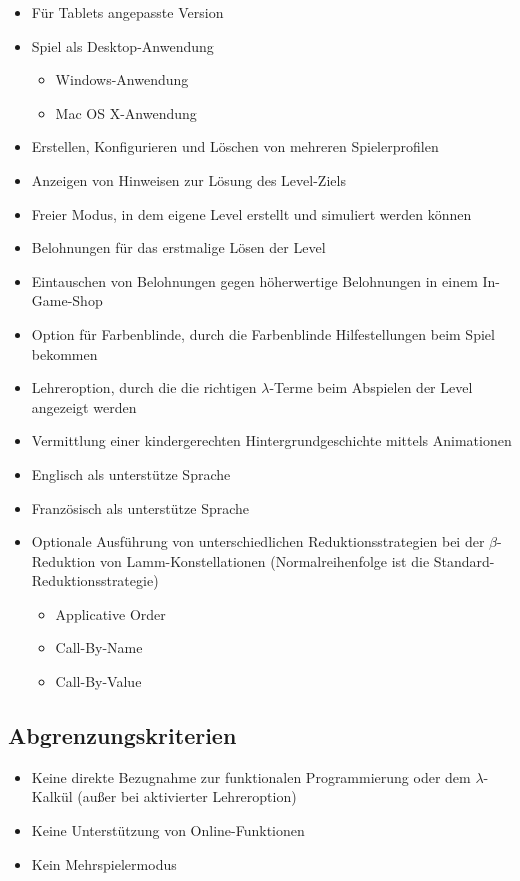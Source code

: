 \begin{itemize}
	\item Für Tablets angepasste Version
	\item Spiel als Desktop-Anwendung
	\begin{itemize}
		\item Windows-Anwendung
		\item Mac OS X-Anwendung
	\end{itemize}
	\item Erstellen, Konfigurieren und Löschen von mehreren Spielerprofilen
	\item Anzeigen von Hinweisen zur Lösung des Level-Ziels
	\item Freier Modus, in dem eigene Level erstellt und simuliert werden können
	\item Belohnungen für das erstmalige Lösen der Level
	\item Eintauschen von Belohnungen gegen höherwertige Belohnungen in einem In-Game-Shop
	\item Option für Farbenblinde, durch die Farbenblinde Hilfestellungen beim Spiel bekommen
	\item Lehreroption, durch die die richtigen $\lambda$-Terme beim Abspielen der Level angezeigt werden
	\item Vermittlung einer kindergerechten Hintergrundgeschichte mittels Animationen
	\item Englisch als unterstütze Sprache
	\item Französisch als unterstütze Sprache
	\item Optionale Ausführung von unterschiedlichen Reduktionsstrategien bei der $\beta$-Reduktion von Lamm-Konstellationen (Normalreihenfolge ist die Standard-Reduktionsstrategie)
	\begin{itemize}
		\item Applicative Order
		\item Call-By-Name
		\item Call-By-Value
	\end{itemize}
		
\end{itemize}

\subsection{Abgrenzungskriterien}

\begin{itemize}
	\item Keine direkte Bezugnahme zur funktionalen Programmierung oder dem $\lambda$-Kalkül (außer bei aktivierter Lehreroption) 
	\item Keine Unterstützung von Online-Funktionen
	\item Kein Mehrspielermodus
\end{itemize}
